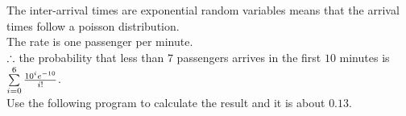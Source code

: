 \begin{pr}
The inter-arrival times are exponential random variables means that the arrival times follow a poisson distribution.\\
The rate is one passenger per minute.\\
$\therefore$ the probability that less than $7$ passengers arrives in the first $10$ minutes is $\sum\limits_{i=0}^6\frac{10^ie^{-10}}{i!}$.\\
Use the following program to calculate the result and it is about $0.13$.\\

\end{pr}
